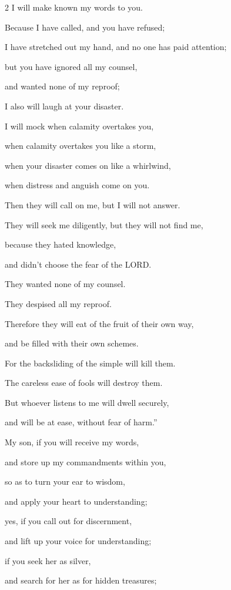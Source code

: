 \begin{multicols}{2}
I will make known my words to you.


\myverse{}Because I have called, and you have refused;

I have stretched out my hand, and no one has paid attention;


\myverse{}but you have ignored all my counsel,

and wanted none of my reproof;


\myverse{}I also will laugh at your disaster.

I will mock when calamity overtakes you,


\myverse{}when calamity overtakes you like a storm,

when your disaster comes on like a whirlwind,

when distress and anguish come on you.


\myverse{}Then they will call on me, but I will not answer.

They will seek me diligently, but they will not find me,


\myverse{}because they hated knowledge,

and didn’t choose the fear of the LORD.


\myverse{}They wanted none of my counsel.

They despised all my reproof.


\myverse{}Therefore they will eat of the fruit of their own way,

and be filled with their own schemes.


\myverse{}For the backsliding of the simple will kill them.

The careless ease of fools will destroy them.


\myverse{}But whoever listens to me will dwell securely,

and will be at ease, without fear of harm.”


\mychapter{} \myverse*{}My son, if you will receive my words,

and store up my commandments within you,


\myverse{}so as to turn your ear to wisdom,

and apply your heart to understanding;


\myverse{}yes, if you call out for discernment,

and lift up your voice for understanding;


\myverse{}if you seek her as silver,

and search for her as for hidden treasures;



\end{multicols}
